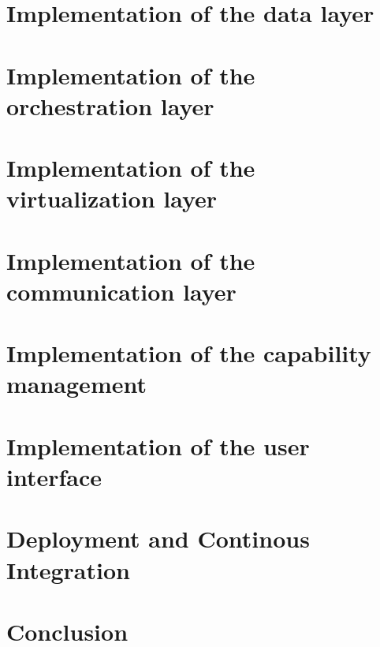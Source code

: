 
\doit

\section{Implementation of the data layer}
\doit

\section{Implementation of the orchestration layer}
\doit

\section{Implementation of the virtualization layer}
\doit

\section{Implementation of the communication layer}
\doit

\section{Implementation of the capability management}
\doit

\section{Implementation of the user interface}
\doit

\section{Deployment and Continous Integration}
\doit

\section{Conclusion}
\doit
